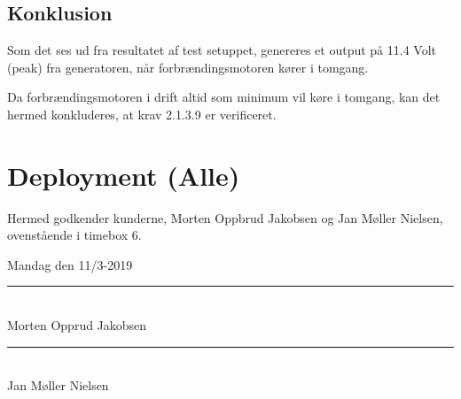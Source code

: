 \subsection{Konklusion}
\label{sec:konklusion}

Som det ses ud fra resultatet af test setuppet, genereres et output på 11.4 Volt (peak) fra generatoren, når forbrændingsmotoren kører i tomgang. 

Da forbrændingsmotoren i drift altid som minimum vil køre i tomgang, kan det hermed konkluderes, at krav 2.1.3.9 er verificeret. 

\section{Deployment (Alle)}
\label{sec:deployment}

Hermed godkender kunderne, Morten Oppbrud Jakobsen og Jan Møller Nielsen, ovenstående i timebox 6.

Mandag den 11/3-2019

\begin{minipage}{.5\textwidth}
  \begin{center}
    \vspace{1.4cm}
    \rule{0.8\textwidth}{0.1pt}\\
    \small{Morten Opprud Jakobsen\\%
    }
  \end{center}
\end{minipage}%
\begin{minipage}{0.5\textwidth}
  \begin{center}
    \vspace{1.4cm}
    \rule{0.8\textwidth}{0.1pt}\\
    \small{Jan Møller Nielsen\\%
    }
  \end{center}
\end{minipage}

